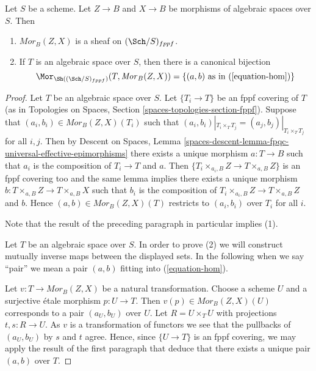 \begin{lemma}
\label{lemma-hom-functor-sheaf}
Let $S$ be a scheme. Let $Z \to B$ and $X \to B$ be morphisms of
algebraic spaces over $S$. Then
\begin{enumerate}
\item $\mathit{Mor}_B(Z, X)$ is a sheaf on
$(\Sch/S)_{fppf}$.
\item If $T$ is an algebraic space over $S$, then there is a
canonical bijection
$$
\Mor_{\Sh((\Sch/S)_{fppf})}(T, \mathit{Mor}_B(Z, X))
=
\{(a, b)\text{ as in }(\ref{equation-hom})\}
$$
\end{enumerate}
\end{lemma}

\begin{proof}
Let $T$ be an algebraic space over $S$. Let $\{T_i \to T\}$ be an fppf
covering of $T$ (as in
Topologies on Spaces, Section \ref{spaces-topologies-section-fppf}).
Suppose that $(a_i, b_i) \in \mathit{Mor}_B(Z, X)(T_i)$ such
that $(a_i, b_i)|_{T_i \times_T T_j} = (a_j, b_j)|_{T_i \times_T T_j}$
for all $i, j$. Then by
Descent on Spaces,
Lemma \ref{spaces-descent-lemma-fpqc-universal-effective-epimorphisms}
there exists a unique morphism $a : T \to B$ such that $a_i$ is the
composition of $T_i \to T$ and $a$. Then
$\{T_i \times_{a_i, B} Z \to T \times_{a, B} Z\}$ is an fppf covering
too and the same lemma implies there exists a unique morphism
$b : T \times_{a, B} Z \to T \times_{a, B} X$ such that $b_i$ is the
composition of $T_i \times_{a_i, B} Z \to T \times_{a, B} Z$ and $b$. Hence
$(a, b) \in \mathit{Mor}_B(Z, X)(T)$ restricts to $(a_i, b_i)$
over $T_i$ for all $i$.

\medskip\noindent
Note that the result of the preceding paragraph in particular implies (1).

\medskip\noindent
Let $T$ be an algebraic space over $S$. In order to prove (2) we will
construct mutually inverse maps between the displayed sets. In the
following when we say ``pair'' we mean a pair $(a, b)$ fitting
into (\ref{equation-hom}).

\medskip\noindent
Let $v : T \to \mathit{Mor}_B(Z, X)$ be a natural transformation.
Choose a scheme $U$ and a surjective \'etale morphism $p : U \to T$.
Then $v(p) \in \mathit{Mor}_B(Z, X)(U)$ corresponds to a pair $(a_U, b_U)$
over $U$. Let $R = U \times_T U$ with projections $t, s : R \to U$.
As $v$ is a transformation of functors we see that the pullbacks of
$(a_U, b_U)$ by $s$ and $t$ agree. Hence, since $\{U \to T\}$ is an
fppf covering, we may apply the result of the first paragraph that
deduce that there exists a unique pair $(a, b)$ over $T$.


\end{proof}
